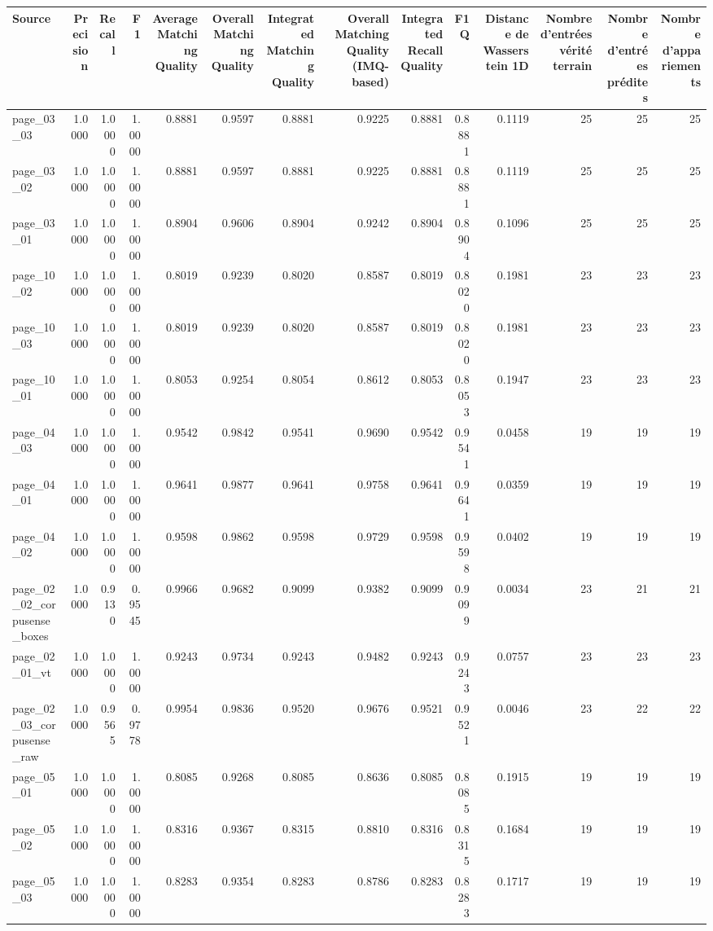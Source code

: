 \begin{tabular}{lrrrrrrrrrrrrr}
\toprule
Source & Precision & Recall & F1 & Average Matching Quality & Overall Matching Quality & Integrated Matching Quality & Overall Matching Quality (IMQ-based) & Integrated Recall Quality & F1Q & Distance de Wasserstein 1D & Nombre d'entrées vérité terrain & Nombre d'entrées prédites & Nombre d'appariements \\
\midrule
page\_03\_03 & 1.0000 & 1.0000 & 1.0000 & 0.8881 & 0.9597 & 0.8881 & 0.9225 & 0.8881 & 0.8881 & 0.1119 & 25 & 25 & 25 \\
page\_03\_02 & 1.0000 & 1.0000 & 1.0000 & 0.8881 & 0.9597 & 0.8881 & 0.9225 & 0.8881 & 0.8881 & 0.1119 & 25 & 25 & 25 \\
page\_03\_01 & 1.0000 & 1.0000 & 1.0000 & 0.8904 & 0.9606 & 0.8904 & 0.9242 & 0.8904 & 0.8904 & 0.1096 & 25 & 25 & 25 \\
page\_10\_02 & 1.0000 & 1.0000 & 1.0000 & 0.8019 & 0.9239 & 0.8020 & 0.8587 & 0.8019 & 0.8020 & 0.1981 & 23 & 23 & 23 \\
page\_10\_03 & 1.0000 & 1.0000 & 1.0000 & 0.8019 & 0.9239 & 0.8020 & 0.8587 & 0.8019 & 0.8020 & 0.1981 & 23 & 23 & 23 \\
page\_10\_01 & 1.0000 & 1.0000 & 1.0000 & 0.8053 & 0.9254 & 0.8054 & 0.8612 & 0.8053 & 0.8053 & 0.1947 & 23 & 23 & 23 \\
page\_04\_03 & 1.0000 & 1.0000 & 1.0000 & 0.9542 & 0.9842 & 0.9541 & 0.9690 & 0.9542 & 0.9541 & 0.0458 & 19 & 19 & 19 \\
page\_04\_01 & 1.0000 & 1.0000 & 1.0000 & 0.9641 & 0.9877 & 0.9641 & 0.9758 & 0.9641 & 0.9641 & 0.0359 & 19 & 19 & 19 \\
page\_04\_02 & 1.0000 & 1.0000 & 1.0000 & 0.9598 & 0.9862 & 0.9598 & 0.9729 & 0.9598 & 0.9598 & 0.0402 & 19 & 19 & 19 \\
page\_02\_02\_corpusense\_boxes & 1.0000 & 0.9130 & 0.9545 & 0.9966 & 0.9682 & 0.9099 & 0.9382 & 0.9099 & 0.9099 & 0.0034 & 23 & 21 & 21 \\
page\_02\_01\_vt & 1.0000 & 1.0000 & 1.0000 & 0.9243 & 0.9734 & 0.9243 & 0.9482 & 0.9243 & 0.9243 & 0.0757 & 23 & 23 & 23 \\
page\_02\_03\_corpusense\_raw & 1.0000 & 0.9565 & 0.9778 & 0.9954 & 0.9836 & 0.9520 & 0.9676 & 0.9521 & 0.9521 & 0.0046 & 23 & 22 & 22 \\
page\_05\_01 & 1.0000 & 1.0000 & 1.0000 & 0.8085 & 0.9268 & 0.8085 & 0.8636 & 0.8085 & 0.8085 & 0.1915 & 19 & 19 & 19 \\
page\_05\_02 & 1.0000 & 1.0000 & 1.0000 & 0.8316 & 0.9367 & 0.8315 & 0.8810 & 0.8316 & 0.8315 & 0.1684 & 19 & 19 & 19 \\
page\_05\_03 & 1.0000 & 1.0000 & 1.0000 & 0.8283 & 0.9354 & 0.8283 & 0.8786 & 0.8283 & 0.8283 & 0.1717 & 19 & 19 & 19 \\
\bottomrule
\end{tabular}
